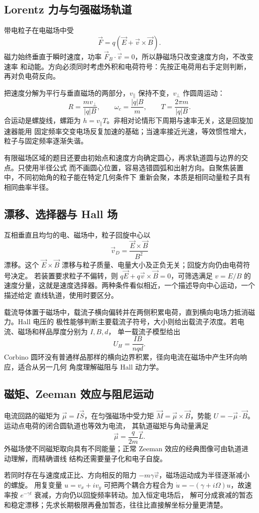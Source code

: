 \subsection*{Lorentz 力与匀强磁场轨道}

带电粒子在电磁场中受
\[
 \vec F=q(\vec E+\vec v\times\vec B).
\]
磁力始终垂直于瞬时速度，功率 $\vec F_B\cdot\vec v=0$，所以静磁场只改变速度方向，不改变速率
和动能。方向必须同时考虑外积和电荷符号：先按正电荷用右手定则判断，再对负电荷反向。

把速度分解为平行与垂直磁场的两部分，$v_\parallel$ 保持不变，$v_\perp$ 作圆周运动：
\[
 R=\frac{mv_\perp}{|q|B},\qquad
 \omega_c=\frac{|q|B}{m},\qquad
 T=\frac{2\pi m}{|q|B}.
\]
合运动是螺旋线，螺距为 $h=v_\parallel T$。非相对论情形下周期与速率无关，这是回旋加速器能用
固定频率交变电场反复加速的基础；当速率接近光速，等效惯性增大，粒子与固定频率逐渐失谐。

有限磁场区域的题目还要由初始点和速度方向确定圆心，再求轨道圆与边界的交点。只使用半径公式
而不画圆心位置，容易选错圆弧和出射方向。自聚焦装置中，不同初始角的粒子能在特定几何条件下
重新会聚，本质是相同动量粒子具有相同曲率半径。

\subsection*{漂移、选择器与 Hall 场}

互相垂直且均匀的电、磁场中，粒子回旋中心以
\[
 \vec v_D=\frac{\vec E\times\vec B}{B^2}
\]
漂移。这个 $\vec E\times\vec B$ 漂移与粒子质量、电量大小及正负无关；回旋方向仍由电荷符号决定。
若装置要求粒子不偏转，则 $q\vec E+q\vec v\times\vec B=0$，可筛选满足
$v=E/B$ 的速度分量，这就是速度选择器。两种条件看似相近，一个描述导向中心运动，一个描述给定
直线轨道，使用时要区分。

载流导体置于磁场中，载流子横向偏转并在两侧积累电荷，直到横向电场力抵消磁力。Hall 电压的
极性能够判断主要载流子符号，大小则给出载流子浓度。若电流、磁场和样品厚度分别为 $I,B,d$，
单一载流子模型给出
\[
 U_H=\frac{IB}{nqd}.
\]
Corbino 圆环没有普通样品那样的横向边界积累，径向电流在磁场中产生环向响应，适合从另一几何
角度理解磁阻与 Hall 动力学。

\subsection*{磁矩、Zeeman 效应与阻尼运动}

电流回路的磁矩为 $\vec\mu=I\vec S$，在匀强磁场中受力矩
$\vec M=\vec\mu\times\vec B$，势能 $U=-\vec\mu\cdot\vec B$。运动点电荷的闭合圆轨道也等效为电流，
其轨道磁矩与角动量满足
\[
 \vec\mu=\frac{q}{2m}\vec L.
\]
外磁场使不同磁矩取向具有不同能量；正常 Zeeman 效应的经典图像可由轨道进动理解，而精确谱线
结构还需要量子化和电子自旋。

若同时存在与速度成正比、方向相反的阻力 $-m\gamma\vec v$，磁场运动成为半径逐渐减小的螺旋。
用复变量 $u=v_x+iv_y$ 可把两个耦合方程合为
$\dot u=-(\gamma+i\Omega)u$，故速率按 $e^{-\gamma t}$ 衰减，方向仍以回旋频率转动。加入恒定电场后，
解可分成衰减的暂态和稳定漂移；先求长期极限再叠加暂态，往往比直接解坐标分量更清楚。

